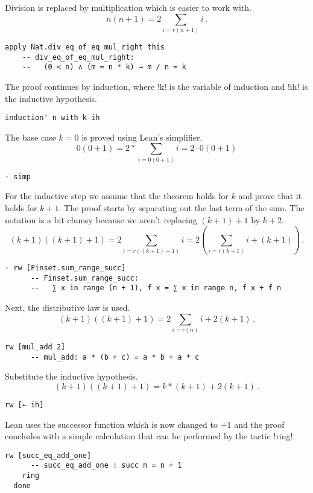
Division is replaced by multiplication which is easier to work with.
\[
n(n+1) = 2\sum_{i=r(n+1)} i\,.
\]
\begin{Verbatim}[firstnumber=last]
  apply Nat.div_eq_of_eq_mul_right this
    -- div_eq_of_eq_mul_right:
    --   (0 < n) ∧ (m = n * k) → m / n = k
\end{Verbatim}

The proof continues by induction, where !k! is the variable of induction and !ih! is the inductive hypothesis.
\begin{Verbatim}[firstnumber=last]
  induction' n with k ih
\end{Verbatim}


The base case $k=0$ is proved using Lean's simplifier.
\[
0(0+1) = 2*\sum_{i=0(0+1)} i = 2\cdot 0(0+1)
\]
\begin{Verbatim}[firstnumber=last]
  · simp
\end{Verbatim}

For the inductive step we assume that the theorem holds for $k$ and prove that it holds for $k+1$. The proof starts by separating out the last term of the sum. The notation is a bit clumsy because we aren't replacing $(k+1)+1$ by $k+2$.
\[
(k+1)((k+1)+1)=2\sum_{i=r((k+1)+1)} i=2\left(\sum_{i=r(k+1)} i + (k+1)\right)\,.
\]
\begin{Verbatim}[firstnumber=last]
  · rw [Finset.sum_range_succ]
      -- Finset.sum_range_succ:
      --   ∑ x in range (n + 1), f x = ∑ x in range n, f x + f n
\end{Verbatim}

Next, the distributive law is used.
\[
(k+1)((k+1)+1)=2\sum_{i=r(n)} i + 2(k+1)\,.
\]
\begin{Verbatim}[firstnumber=last]
    rw [mul_add 2]
      -- mul_add: a * (b + c) = a * b + a * c
\end{Verbatim}

Substitute the inductive hypothesis.
\[
(k+1)((k+1)+1)=k * (k+1) + 2(k+1)\,.
\]
\begin{Verbatim}[firstnumber=last]
    rw [← ih]
\end{Verbatim}
Lean uses the successor function which is now changed to $+1$ and the proof concludes with a simple calculation that can be performed by the tactic !ring!.
\begin{Verbatim}[firstnumber=last]
    rw [succ_eq_add_one]
      -- succ_eq_add_one : succ n = n + 1
    ring
  done
\end{Verbatim}

